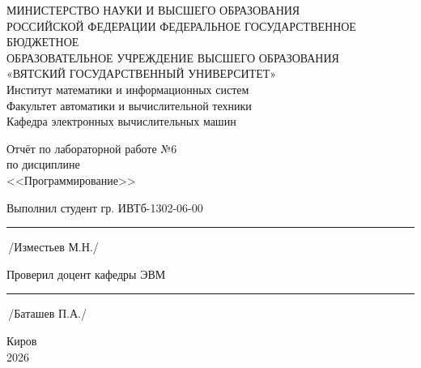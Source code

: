 \documentclass[oneside,a4paper,14pt]{extarticle}
\begin{document}
    \newpage\thispagestyle{empty}
    \begin{center}
        МИНИСТЕРСТВО НАУКИ И ВЫСШЕГО ОБРАЗОВАНИЯ\\
            РОССИЙСКОЙ ФЕДЕРАЦИИ
            ФЕДЕРАЛЬНОЕ ГОСУДАРСТВЕННОЕ БЮДЖЕТНОЕ\\
            ОБРАЗОВАТЕЛЬНОЕ
            УЧРЕЖДЕНИЕ ВЫСШЕГО ОБРАЗОВАНИЯ\\
            «ВЯТСКИЙ ГОСУДАРСТВЕННЫЙ УНИВЕРСИТЕТ»\\
            Институт математики и информационных систем\\
            Факультет автоматики и вычислительной техники\\
            Кафедра электронных вычислительных машин
    \end{center}
    \vspace{20mm}

    \begin{center}
        Отчёт по лабораторной работе №6\\
        по дисциплине\\
        <<Программирование>>\\
    \end{center}
    \vspace{48mm}

    Выполнил студент гр. ИВТб-1302-06-00 \hspace{10mm} \rule[-0,5mm]{30mm}{0.15mm}\,/Изместьев М.Н./


    Проверил доцент кафедры ЭВМ \hfill  \rule[-0,5mm]{30mm}{0.15mm}\,/Баташев П.А./

    \vfill
    \begin{center}
        Киров\\
        2026
    \end{center}

    \newpage\thispagestyle{empty}
\end{document}
